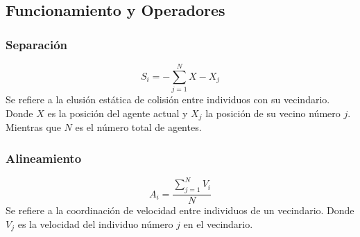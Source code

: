 \subsection{Funcionamiento y Operadores}

\subsubsection{Separación}
\begin{equation}
    S_i = -\sum_{j=1}^N X - X_j
\end{equation}
Se refiere a la elusión estática de colisión entre individuos con su vecindario. Donde $X$ es la posición del agente actual y $X_j$ la posición de su vecino número $j$. Mientras que $N$ es el número total de agentes.

\subsubsection{Alineamiento}
\begin{equation}
    A_i = \frac{\sum_{j=1}^N V_i}{N}
\end{equation}
Se refiere a la coordinación de velocidad entre individuos de un vecindario. Donde $V_j$ es la velocidad del individuo número $j$ en el vecindario.

